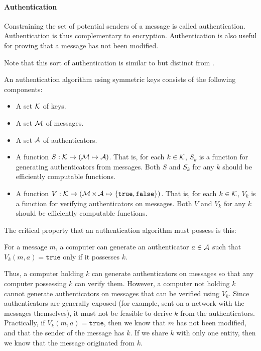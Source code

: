 \paragraph{Authentication}\label{par:Authentication}
Constraining the set of potential senders of a message is called authentication.
Authentication is thus complementary to encryption.
Authentication is also useful for proving that a message has not been modified.

Note that this sort of authentication is similar to but distinct from .

An authentication algorithm using symmetric keys consists of the following components:
\begin{itemize}[noitemsep]
\item A set $\operatorname{\mathcal{K}}$ of keys.
\item A set $\operatorname{\mathcal{M}}$ of messages.
\item A set $\operatorname{\mathcal{A}}$ of authenticators.
\item A function $S : \operatorname{\mathcal{K}} \mapsto (\operatorname{\mathcal{M}} \mapsto \operatorname{\mathcal{A}})$.
  That is, for each $k \in \operatorname{\mathcal{K}}$, $S_{k}$ is a function for generating authenticators from messages.
  Both $S$ and $S_{k}$ for any $k$ should be efficiently computable functions.
\item A function $V : \operatorname{\mathcal{K}} \mapsto (\operatorname{\mathcal{M}} \times \operatorname{\mathcal{A}} \mapsto \lbrace \mathtt{true}, \mathtt{false} \rbrace)$.
  That is, for each $k \in \operatorname{\mathcal{K}}$, $V_{k}$ is a function for verifying authenticators on messages.
  Both $V$ and $V_{k}$ for any $k$ should be efficiently computable functions.
\end{itemize}

The critical property that an authentication algorithm must possess is this:
\begin{blackbox}
  For a message $m$, a computer can generate an authenticator $a \in \operatorname{\mathcal{A}}$ such that $V_{k}(m, a) = \mathtt{true}$ only if it possesses $k$.
\end{blackbox}

Thus, a computer holding $k$ can generate authenticators on messages so that any computer possessing $k$ can verify them.
However, a computer not holding $k$ cannot generate authenticators on messages that can be verified using $V_{k}$.
Since authenticators are generally exposed (for example, sent on a network with the messages themselves), it must not be feasible to derive $k$ from the authenticators.
Practically, if $V_{k}(m, a) = \mathtt{true}$, then we know that $m$ has not been modified, and that the sender of the message has $k$.
If we share $k$ with only one entity, then we know that the message originated from $k$.

